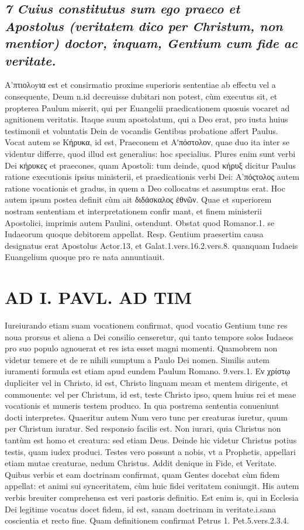 \documentclass{article}
\begin{document}
\begin{pages}
\subsection*{\textit{7 Cuius constitutus sum ego praeco et Apostolus (veritatem dico per Christum, non mentior) doctor, inquam, Gentium cum fide ac veritate. }}\pstart Α’πτιολoyια est et consirmatio proxime superioris sententiae ab effectu vel a consequente, Deum n.id decreuisse dubitari non potest, cùm executus sit, et propterea Paulum miserit, qui per Euangelii praedicationem quosuis vocaret ad agnitionem veritatis. Itaque suum apostolatum, qui a Deo erat, pro iusta huius testimonii et voluntatis Dein de vocandis Gentibus probatione affert Paulus. Vocat autem se Κήρυκα, id est, Praeconem et Aʹπόστολον, quae duo ita inter se videntur differre, quod illud est generalius: hoc specialius. Plures enim sunt verbi Dei κήρυκες et praecones, quam Apostoli: tum deinde, quod κήρυξ dicitur Paulus ratione executionis ipsius ministerii, et praedicationis verbi Dei: Α’πόςτολος autem ratione vocationis et gradus, in quem a Deo collocatus et assumptus erat. Hoc autem ipsum postea definit cùm ait διδάσκαλος ἐθνῶν. Quae et superiorem nostram sententiam et interpretationem confir mant, et finem ministerii Apostolici, imprimis autem Paulini, ostendunt.  \pend\pstart Obstat quod Romanor.1. se Iudaeorum quoque debitorem appellat. Resp. Gentium praesertim causa designatus erat Apostolus Actor.13, et Galat.1.vers.16.2.vers.8. quanquam Iudaeis Euangelium quoque pro re nata annuntiauit.  \pend
\section*{AD I. PAVL. AD TIM }
\marginpar{[ p.64 ]}\pstart Iureiurando etiam suam vocationem confirmat, quod vocatio Gentium tunc res noua prorsus et aliena a Dei consilio censeretur, qui tanto tempore solos Iudaeos pro suo populo agnouerat et res ista esset magni momenti. Quamobrem non videtur temere et de re nihili sumptum a Paulo Dei nomen. Similis autem iuramenti formula est etiam apud eundem Paulum Romano. 9.vers.1.  \pend\pstart Εν χρίστῳ dupliciter vel in Christo, id est, Christo linguam meam et mentem dirigente, et commouente: vel per Christum, id est, teste Christo ipso, quem huius rei et meae vocationis et muneris testem produco. In qua postrema sententia conueniunt docti interpretes. Quaeritur autem Num vero tunc per creaturas iuretur, quum per Christum iuratur. Sed responsio facilis est. Non iurari, quia Christus non tantùm est homo et creatura: sed etiam Deus. Deinde hic videtur Christus potius testis, quam iudex produci. Testes vero possunt a nobis, vt a Prophetis, appellari etiam mutae creaturae, nedum Christus.  \pend\pstart Addit denique in Fide, et Veritate. Quibus verbis et eam doctrinam confirmat, quam Gentes docebat cùm fidem appellat: et animi sui synceritatem, cùm huic fidei veritatem coniungit. His autem verbis breuiter comprehensa est veri pastoris definitio. Est enim is, qui in Ecclesia Dei legitime vocatus docet fidem, id est, sanam doctrinam in veritate.i.sana coscientia et recto fine. Quam definitionem confirmat Petrus 1. Pet.5.vers.2.3.4.  \pend

\end{pages}
\end{document}
